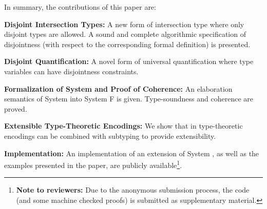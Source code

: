 In summary, the contributions of this paper are:

\begin{itemize*}

\item {\bf Disjoint Intersection Types:} A new form of intersection
  type where only disjoint types are allowed. A sound and complete
  algorithmic specification of disjointness (with respect to the
  corresponding formal definition) is presented.

\item {\bf Disjoint Quantification:} A novel form of universal
quantification where type variables can have disjointness
constraints.

\item {\bf Formalization of System \name and Proof of Coherence:} An
  elaboration semantics of System \name into System F is
  given. Type-soundness and coherence are proved.

\item {\bf Extensible Type-Theoretic Encodings:} We show that in \name 
 type-theoretic encodings can be combined with subtyping to provide extensibility.

\item {\bf Implementation:} An implementation of an
  extension of System \name, as well as the examples presented in the
  paper, are publicly available\footnote{{\bf Note to reviewers:} Due
    to the anonymous submission process, the code (and some machine
    checked proofs) is submitted as supplementary material.}.

\end{itemize*}

